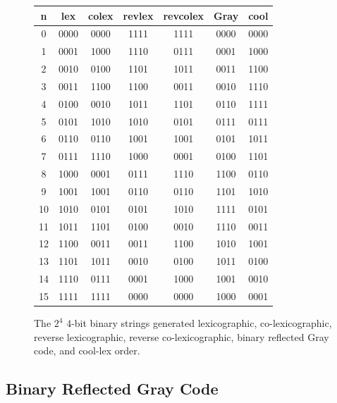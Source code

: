 \begin{figure}[]

\begin{center}
    \begin{tabular}{ |c|c|c|c|c||c||c| } 
 \hline



        n &  lex  & colex & revlex & revcolex & Gray & cool\\  
\hline
0 & 0000 & 0000 & 1111 & 1111 & 0000   & 0000  \\
1 & 0001 & 1000 & 1110 & 0111 & 0001   & 1000  \\
2 & 0010 & 0100 & 1101 & 1011 & 0011   & 1100  \\
3 & 0011 & 1100 & 1100 & 0011 & 0010   & 1110  \\
4 & 0100 & 0010 & 1011 & 1101 & 0110   & 1111  \\
5 & 0101 & 1010 & 1010 & 0101 & 0111   & 0111  \\
6 & 0110 & 0110 & 1001 & 1001 & 0101   & 1011  \\
7 & 0111 & 1110 & 1000 & 0001 & 0100   & 1101  \\
8 & 1000 & 0001 & 0111 & 1110 & 1100   & 0110  \\
9 & 1001 & 1001 & 0110 & 0110 & 1101   & 1010  \\
10 & 1010 & 0101 & 0101 & 1010 & 1111  & 0101  \\
11 & 1011 & 1101 & 0100 & 0010 & 1110  & 0011  \\
12 & 1100 & 0011 & 0011 & 1100 & 1010  & 1001  \\
13 & 1101 & 1011 & 0010 & 0100 & 1011  & 0100  \\
14 & 1110 & 0111 & 0001 & 1000 & 1001  & 0010  \\
15 & 1111 & 1111 & 0000 & 0000 & 1000  & 0001  \\

\hline

\end{tabular}

\end{center}
        \caption{The $2^4$ $4$-bit binary strings generated lexicographic, co-lexicographic, reverse lexicographic, reverse co-lexicographic, binary reflected Gray code, and cool-lex order.}
        \label{fig:bintable}
\end{figure}


\subsection{Binary Reflected Gray Code}

